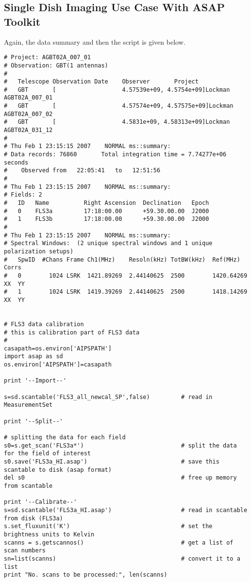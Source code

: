 \subsection{Single Dish Imaging Use Case With ASAP Toolkit}
\label{subsection:sd.imaging.usecase}

Again, the data summary and then the script is given below. 

\small
\begin{verbatim}
# Project: AGBT02A_007_01
# Observation: GBT(1 antennas)
# 
#   Telescope Observation Date    Observer       Project
#   GBT       [                   4.57539e+09, 4.5754e+09]Lockman        AGBT02A_007_01
#   GBT       [                   4.57574e+09, 4.57575e+09]Lockman        AGBT02A_007_02
#   GBT       [                   4.5831e+09, 4.58313e+09]Lockman        AGBT02A_031_12
# 
# Thu Feb 1 23:15:15 2007    NORMAL ms::summary:
# Data records: 76860       Total integration time = 7.74277e+06 seconds
#    Observed from   22:05:41   to   12:51:56
# 
# Thu Feb 1 23:15:15 2007    NORMAL ms::summary:
# Fields: 2
#   ID   Name          Right Ascension  Declination   Epoch
#   0    FLS3a         17:18:00.00      +59.30.00.00  J2000
#   1    FLS3b         17:18:00.00      +59.30.00.00  J2000
# 
# Thu Feb 1 23:15:15 2007    NORMAL ms::summary:
# Spectral Windows:  (2 unique spectral windows and 1 unique polarization setups)
#   SpwID  #Chans Frame Ch1(MHz)    Resoln(kHz) TotBW(kHz)  Ref(MHz)    Corrs
#   0        1024 LSRK  1421.89269  2.44140625  2500        1420.64269  XX  YY
#   1        1024 LSRK  1419.39269  2.44140625  2500        1418.14269  XX  YY


# FLS3 data calibration
# this is calibration part of FLS3 data
#
casapath=os.environ['AIPSPATH']
import asap as sd
os.environ['AIPSPATH']=casapath

print '--Import--'

s=sd.scantable('FLS3_all_newcal_SP',false)         # read in MeasurementSet

print '--Split--'

# splitting the data for each field
s0=s.get_scan('FLS3a*')                            # split the data for the field of interest
s0.save('FLS3a_HI.asap')                           # save this scantable to disk (asap format)
del s0                                             # free up memory from scantable

print '--Calibrate--'
s=sd.scantable('FLS3a_HI.asap')                    # read in scantable from disk (FLS3a)
s.set_fluxunit('K')                                # set the brightness units to Kelvin
scanns = s.getscannos()                            # get a list of scan numbers
sn=list(scanns)                                    # convert it to a list
print "No. scans to be processed:", len(scanns)


\end{verbatim}
